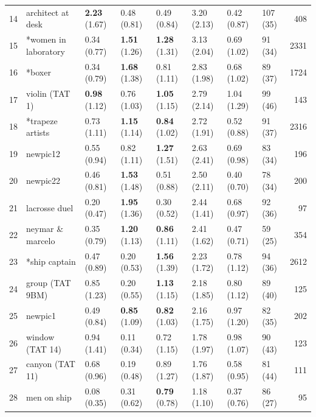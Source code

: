 \documentclass[man,a4paper,mask]{apa6}\usepackage[]{graphicx}\usepackage[]{color}
\begin{document}
\begin{table}
\begin{threeparttable}
\begin{tabularx}{\textwidth}{rlllllllr}
   14 & architect at desk & \textbf{2.23} (1.67) & 0.48 (0.81) & 0.49 (0.84) & 3.20 (2.13) & 0.42 (0.87) & 107 (35) & 408 \\ 
   15 & *women in laboratory & 0.34 (0.77) & \textbf{1.51} (1.26) & \textbf{1.28} (1.31) & 3.13 (2.04) & 0.69 (1.02) & 91 (34) & 2331 \\ 
   16 & *boxer & 0.34 (0.79) & \textbf{1.68} (1.38) & 0.81 (1.11) & 2.83 (1.98) & 0.68 (1.02) & 89 (37) & 1724 \\ 
   17 & violin (TAT 1) & \textbf{0.98} (1.12) & 0.76 (1.03) & \textbf{1.05} (1.15) & 2.79 (2.14) & 1.04 (1.29) & 99 (46) & 143 \\ 
   18 & *trapeze artists & 0.73 (1.11) & \textbf{1.15} (1.14) & \textbf{0.84} (1.02) & 2.72 (1.91) & 0.52 (0.88) & 91 (37) & 2316 \\ 
   19 & newpic12 & 0.55 (0.94) & 0.82 (1.11) & \textbf{1.27} (1.51) & 2.63 (2.41) & 0.69 (0.98) & 83 (34) & 196 \\ 
   20 & newpic22 & 0.46 (0.81) & \textbf{1.53} (1.48) & 0.51 (0.88) & 2.50 (2.11) & 0.40 (0.70) & 78 (34) & 200 \\ 
   21 & lacrosse duel & 0.20 (0.47) & \textbf{1.95} (1.36) & 0.30 (0.52) & 2.44 (1.41) & 0.68 (0.97) & 92 (36) &  97 \\ 
   22 & neymar \& marcelo & 0.35 (0.79) & \textbf{1.20} (1.13) & \textbf{0.86} (1.11) & 2.41 (1.62) & 0.47 (0.71) & 59 (25) & 354 \\ 
   23 & *ship captain & 0.47 (0.89) & 0.20 (0.53) & \textbf{1.56} (1.39) & 2.23 (1.72) & 0.78 (1.12) & 94 (36) & 2612 \\ 
   24 & group (TAT 9BM) & 0.85 (1.23) & 0.20 (0.55) & \textbf{1.13} (1.15) & 2.18 (1.85) & 0.80 (1.12) & 89 (40) & 125 \\ 
   25 & newpic1 & 0.49 (0.84) & \textbf{0.85} (1.09) & \textbf{0.82} (1.03) & 2.16 (1.75) & 0.97 (1.20) & 82 (35) & 202 \\ 
   26 & window (TAT 14) & 0.94 (1.41) & 0.11 (0.34) & 0.72 (1.15) & 1.78 (1.97) & 0.98 (1.07) & 90 (43) & 123 \\ 
   27 & canyon (TAT 11) & 0.68 (0.96) & 0.19 (0.48) & 0.89 (1.27) & 1.76 (1.87) & 0.58 (0.95) & 81 (44) & 111 \\ 
   28 & men on ship & 0.08 (0.35) & 0.31 (0.62) & \textbf{0.79} (0.78) & 1.18 (1.10) & 0.37 (0.76) & 86 (27) &  95 \\ 
   \hline


\end{tabularx}
\end{threeparttable}
\end{table}
\end{document}
